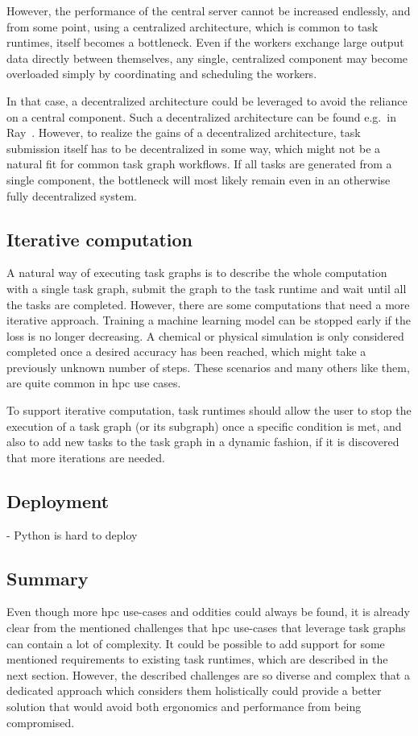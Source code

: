 \begin{description}
		However, the performance of the central server cannot be increased endlessly, and from some point,
		using a centralized architecture, which is common to task runtimes, itself becomes a bottleneck.
		Even if the workers exchange large output data directly between themselves, any single, centralized
		component may become overloaded simply by coordinating and scheduling the workers.

		In that case, a decentralized architecture could be leveraged to avoid the reliance on a central
		component. Such a decentralized architecture can be found e.g.\ in Ray~\cite{ray}.
		However, to realize the gains of a decentralized architecture, task submission itself has to be
		decentralized in some way, which might not be a natural fit for common task graph workflows. If all
		tasks are generated from a single component, the bottleneck will most likely remain even in an
		otherwise fully decentralized system.
\end{description}

\subsection{Iterative computation}
A natural way of executing task graphs is to describe the whole computation with a single task
graph, submit the graph to the task runtime and wait until all the tasks are completed. However,
there are some computations that need a more iterative approach. Training a machine learning model
can be stopped early if the loss is no longer decreasing. A chemical or physical simulation is only
considered completed once a desired accuracy has been reached, which might take a previously
unknown number of steps. These scenarios and many others like them, are quite common in
\gls{hpc} use cases.

To support iterative computation, task runtimes should allow the user to stop the execution of a
task graph (or its subgraph) once a specific condition is met, and also to add new tasks to the
task graph in a dynamic fashion, if it is discovered that more iterations are needed.

\subsection{Deployment}
- Python is hard to deploy

\subsection{Summary}
Even though more \gls{hpc} use-cases and oddities could always be found, it is
already clear from the mentioned challenges that \gls{hpc} use-cases that
leverage task graphs can contain a lot of complexity. It could be possible to add support for some
mentioned requirements to existing task runtimes, which are described in the next section. However,
the described challenges are so diverse and complex that a dedicated approach which considers them
holistically could provide a better solution that would avoid both ergonomics and performance from
being compromised.

